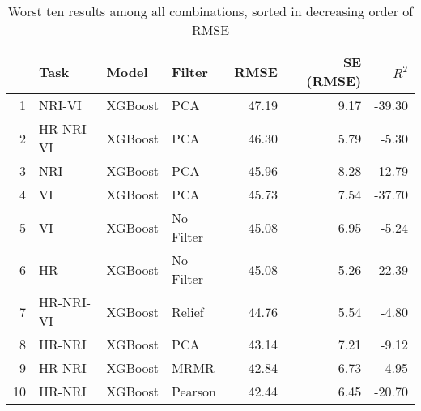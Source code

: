 \begin{table}[ht!]
\centering
\caption{Worst ten results among all combinations, sorted in decreasing order of RMSE} 
\label{tab:perf-worst-10}
\begin{tabular}{rlllrrr}
  \hline
 & Task & Model & Filter & RMSE & SE (RMSE) & $R^2$ \\ 
  \hline
1 & NRI-VI & XGBoost & PCA & 47.19 & 9.17 & -39.30 \\ 
  2 & HR-NRI-VI & XGBoost & PCA & 46.30 & 5.79 & -5.30 \\ 
  3 & NRI & XGBoost & PCA & 45.96 & 8.28 & -12.79 \\ 
  4 & VI & XGBoost & PCA & 45.73 & 7.54 & -37.70 \\ 
  5 & VI & XGBoost & No Filter & 45.08 & 6.95 & -5.24 \\ 
  6 & HR & XGBoost & No Filter & 45.08 & 5.26 & -22.39 \\ 
  7 & HR-NRI-VI & XGBoost & Relief & 44.76 & 5.54 & -4.80 \\ 
  8 & HR-NRI & XGBoost & PCA & 43.14 & 7.21 & -9.12 \\ 
  9 & HR-NRI & XGBoost & MRMR & 42.84 & 6.73 & -4.95 \\ 
  10 & HR-NRI & XGBoost & Pearson & 42.44 & 6.45 & -20.70 \\ 
   \hline
\end{tabular}
\end{table}
